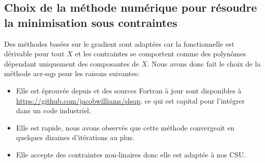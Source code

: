 \subsection{Choix de la méthode numérique pour résoudre la minimisation sous contraintes}

  Des méthodes basées sur le gradient sont adaptées car la fonctionnelle est dérivable pour tout \(X\) et les contraintes se comportent comme des polynômes dépendant uniquement des composantes de \(X\). Nous avons donc fait le choix de la méthode \gls{acr-sqp} pour les raisons suivantes:
 
  \begin{itemize}
    \item Elle est éprouvée depuis \cite{kraft_software_1988} et des sources Fortran à jour sont disponibles à \url{https://github.com/jacobwilliams/slsqp}, ce qui est capital pour l'intégrer dans un code industriel.
    \item Elle est rapide, nous avons observés que cette méthode convergeait en quelques dizaines d'itérations au plus.
    \item Elle accepte des contraintes non-linaires donc elle est adaptée à nos CSU.
  \end{itemize}


